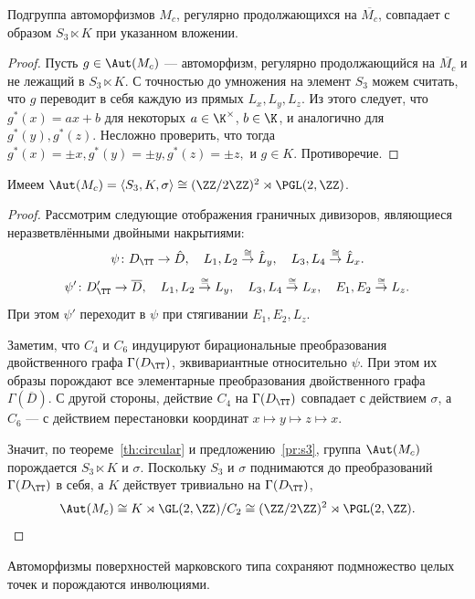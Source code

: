 \begin{proposition}\label{pr:s3}
Подгруппа автоморфизмов $M_c$, регулярно продолжающихся на $\overline{M_c}$, совпадает с образом $S_3\ltimes K$ при указанном вложении.
\end{proposition}
\begin{proof}
Пусть $g\in\Aut(M_c)$ --- автоморфизм, регулярно продолжающийся на $\overline{M_c}$ и не лежащий в $S_3\ltimes K$. С точностью до умножения на элемент $S_3$ можем считать, что $g$ переводит в себя каждую из прямых $L_x, L_y, L_z$. Из этого следует, что $g^*(x)=ax+b$ для некоторых $a\in\K^\times$, $b\in\K$, и аналогично для  $g^*(y),g^*(z)$. Несложно проверить, что тогда $g^*(x)=\pm x, g^*(y)=\pm y, g^*(z)=\pm z,$ и $g\in K$. Противоречие.
\end{proof}


\begin{theorem}\label{th:aut}
Имеем $\Aut(M_c) =\langle S_3,K,\sigma\rangle\cong (\ZZ/2\ZZ)^2\rtimes \PGL(2,\ZZ)$.
\end{theorem}
\begin{proof}
Рассмотрим следующие отображения граничных дивизоров, являющиеся неразветвлёнными двойными накрытиями:
\[\psi\colon D_\TT\to \hat{D},\quad 
L_1,L_2\stackrel{\cong}{\to}\hat L_y,\quad
L_3,L_4\stackrel{\cong}{\to}\hat L_x.\]
\[\psi'\colon D_\TT'\to \overline{D},\quad 
L_1,L_2\stackrel{\cong}{\to}L_y,\quad
L_3,L_4\stackrel{\cong}{\to}L_x,\quad
E_1,E_2\stackrel{\cong}{\to}L_z.\]
При этом $\psi'$ переходит в $\psi$ при стягивании $E_1,E_2, L_z$. 

Заметим, что $C_4$ и $C_6$ индуцируют бирациональные преобразования двойственного графа $\Gamma(D_\TT)$, эквивариантные относительно $\psi$. При этом их образы порождают все элементарные преобразования двойственного графа $\Gamma(\overline{D})$. С другой стороны, действие $C_4$ на $\Gamma(D_\TT)$ совпадает с действием $\sigma$, а $C_6$ --- с действием перестановки координат $x\mapsto y\mapsto z\mapsto x$. 

Значит, по теореме~\ref{th:circular} и предложению~\ref{pr:s3}, группа $\Aut(M_c)$  порождается $S_3\ltimes K$ и $\sigma$. Поскольку $S_3$ и $\sigma$ поднимаются до преобразований $\Gamma(D_\TT)$ в себя, а $K$ действует тривиально на $\Gamma(D_\TT)$, \[\Aut(M_c)\cong K\rtimes \GL(2,\ZZ)/C_2\cong (\ZZ/2\ZZ)^2\rtimes\PGL(2,\ZZ).\]
\end{proof}

\begin{corollary}
Автоморфизмы поверхностей марковского типа сохраняют подмножество целых точек и порождаются инволюциями.
\end{corollary}

